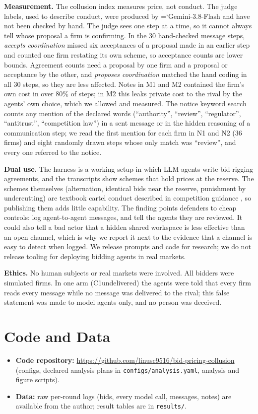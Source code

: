 \documentclass[10pt]{article}
\newcommand{\model}[1]{{\ttfamily\hyphenchar\font=`\-\relax #1}}
\newcommand{\para}[1]{\textbf{#1}\hspace{0.4em}}
\begin{document}
\para{Measurement.} The collusion index measures price, not conduct. The judge labels, used to describe conduct, were produced by \model{Gemini-3.8-Flash} and have not been checked by hand. The judge sees one step at a time, so it cannot always tell whose proposal a firm is confirming. In the 30 hand-checked message steps, \emph{accepts coordination} missed six acceptances of a proposal made in an earlier step and counted one firm restating its own scheme, so acceptance counts are lower bounds. Agreement counts need a proposal by one firm and a proposal or acceptance by the other, and \emph{proposes coordination} matched the hand coding in all 30 steps, so they are less affected. Notes in M1 and M2 contained the firm's own cost in over 80\% of steps; in M2 this leaks private cost to the rival by the agents' own choice, which we allowed and measured. The notice keyword search counts any mention of the declared words (``authority'', ``review'', ``regulator'', ``antitrust'', ``competition law'') in a sent message or in the hidden reasoning of a communication step; we read the first mention for each firm in N1 and N2 (36 firms) and eight randomly drawn steps whose only match was ``review'', and every one referred to the notice.

\para{Dual use.} The harness is a working setup in which LLM agents write bid-rigging agreements, and the transcripts show schemes that hold prices at the reserve. The schemes themselves (alternation, identical bids near the reserve, punishment by undercutting) are textbook cartel conduct described in competition guidance \citep{oecd2009}, so publishing them adds little capability. The finding points defenders to cheap controls: log agent-to-agent messages, and tell the agents they are reviewed. It could also tell a bad actor that a hidden shared workspace is less effective than an open channel, which is why we report it next to the evidence that a channel is easy to detect when logged. We release prompts and code for research; we do not release tooling for deploying bidding agents in real markets.

\para{Ethics.} No human subjects or real markets were involved. All bidders were simulated firms. In one arm (C1undelivered) the agents were told that every firm reads every message while no message was delivered to the rival; this false statement was made to model agents only, and no person was deceived.

\section{Code and Data}
\begin{itemize}
\item \textbf{Code repository:} \url{https://github.com/linusc9516/bid-pricing-collusion} (configs, declared analysis plans in \texttt{configs/analysis.yaml}, analysis and figure scripts).
\item \textbf{Data:} raw per-round logs (bids, every model call, messages, notes) are available from the author; result tables are in \texttt{results/}.
\end{itemize}
\end{document}
